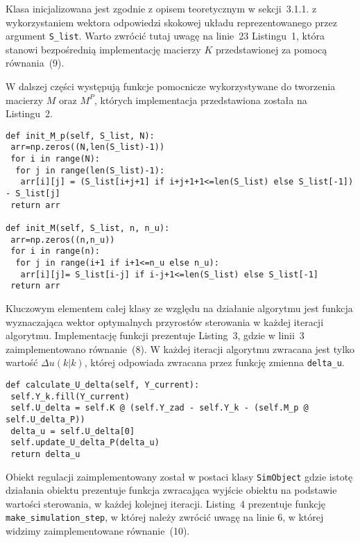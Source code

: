 Klasa inicjalizowana jest zgodnie z opisem teoretycznym w sekcji~3.1.1. z wykorzystaniem wektora odpowiedzi skokowej układu reprezentowanego przez argument \texttt{S{\_}list}. Warto zwrócić tutaj uwagę na linie~23 Listingu~1, która stanowi bezpośrednią implementację macierzy \(K\) przedstawionej za pomocą równania~(9).
\par W dalszej części występują funkcje pomocnicze wykorzystywane do tworzenia macierzy \(M\) oraz \(M^P\), których implementacja przedstawiona została na Listingu~2.

\begin{listing}[!htb]
\begin{verbatim}
def init_M_p(self, S_list, N):
 arr=np.zeros((N,len(S_list)-1))
 for i in range(N):
  for j in range(len(S_list)-1):
   arr[i][j] = (S_list[i+j+1] if i+j+1+1<=len(S_list) else S_list[-1]) - S_list[j]
 return arr

def init_M(self, S_list, n, n_u):
 arr=np.zeros((n,n_u))
 for i in range(n):
  for j in range(i+1 if i+1<=n_u else n_u):
   arr[i][j]= S_list[i-j] if i-j+1<=len(S_list) else S_list[-1]
 return arr
\end{verbatim}
\end{listing}

Kluczowym elementem całej klasy ze względu na działanie algorytmu jest funkcja wyznaczająca wektor optymalnych przyrostów sterowania w każdej iteracji algorytmu. Implementację funkcji prezentuje Listing~3, gdzie w linii~3 zaimplementowano równanie~(8). W każdej iteracji algorytmu zwracana jest tylko wartość \(\Delta u(k|k) \), której odpowiada zwracana przez funkcję zmienna \texttt{delta{\_}u}.

\begin{listing}[!htb]
\begin{verbatim}
def calculate_U_delta(self, Y_current): 
 self.Y_k.fill(Y_current)
 self.U_delta = self.K @ (self.Y_zad - self.Y_k - (self.M_p @ self.U_delta_P))
 delta_u = self.U_delta[0]
 self.update_U_delta_P(delta_u)
 return delta_u
\end{verbatim}
\end{listing}

\par Obiekt regulacji zaimplementowany został w postaci klasy \texttt{SimObject} gdzie istotę działania obiektu prezentuje funkcja zwracająca wyjście obiektu na podstawie wartości sterowania, w każdej kolejnej iteracji. Listing~4 prezentuje funkcję   \texttt{make{\_}simulation{\_}step}, w której należy zwrócić uwagę na linie 6, w której widzimy zaimplementowane równanie~(10).

